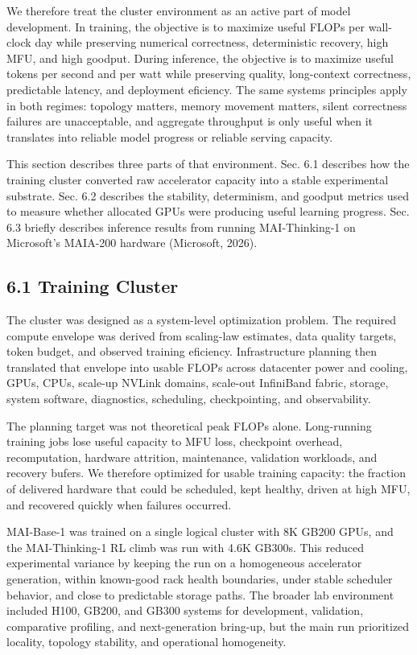 \documentclass[
  10
]{article}
\begin{document}
We therefore treat the cluster environment as an active part of model
development. In training, the objective is to maximize useful FLOPs per
wall-clock day while preserving numerical correctness, deterministic
recovery, high MFU, and high goodput. During inference, the objective is
to maximize useful tokens per second and per watt while preserving
quality, long-context correctness, predictable latency, and deployment
eficiency. The same systems principles apply in both regimes: topology
matters, memory movement matters, silent correctness failures are
unacceptable, and aggregate throughput is only useful when it translates
into reliable model progress or reliable serving capacity.

This section describes three parts of that environment. Sec. 6.1
describes how the training cluster converted raw accelerator capacity
into a stable experimental substrate. Sec. 6.2 describes the stability,
determinism, and goodput metrics used to measure whether allocated GPUs
were producing useful learning progress. Sec. 6.3 briefly describes
inference results from running MAI-Thinking-1 on Microsoft's MAIA-200
hardware (Microsoft, 2026).

\subsection{6.1 Training Cluster}\label{training-cluster}

The cluster was designed as a system-level optimization problem. The
required compute envelope was derived from scaling-law estimates, data
quality targets, token budget, and observed training eficiency.
Infrastructure planning then translated that envelope into usable FLOPs
across datacenter power and cooling, GPUs, CPUs, scale-up NVLink
domains, scale-out InfiniBand fabric, storage, system software,
diagnostics, scheduling, checkpointing, and observability.

The planning target was not theoretical peak FLOPs alone. Long-running
training jobs lose useful capacity to MFU loss, checkpoint overhead,
recomputation, hardware attrition, maintenance, validation workloads,
and recovery bufers. We therefore optimized for usable training
capacity: the fraction of delivered hardware that could be scheduled,
kept healthy, driven at high MFU, and recovered quickly when failures
occurred.

MAI-Base-1 was trained on a single logical cluster with 8K GB200 GPUs,
and the MAI-Thinking-1 RL climb was run with 4.6K GB300s. This reduced
experimental variance by keeping the run on a homogeneous accelerator
generation, within known-good rack health boundaries, under stable
scheduler behavior, and close to predictable storage paths. The broader
lab environment included H100, GB200, and GB300 systems for development,
validation, comparative profiling, and next-generation bring-up, but the
main run prioritized locality, topology stability, and operational
homogeneity.
\end{document}
